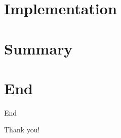 \documentclass{beamer}
\begin{document}
\section{Implementation}


\section{Summary}
%

\section*{End}

{
\framenonumber
\begin{frame}[noframenumbering]{End}
\begin{center}
\Huge Thank you!
\end{center}
\end{frame}
}



\end{document}
